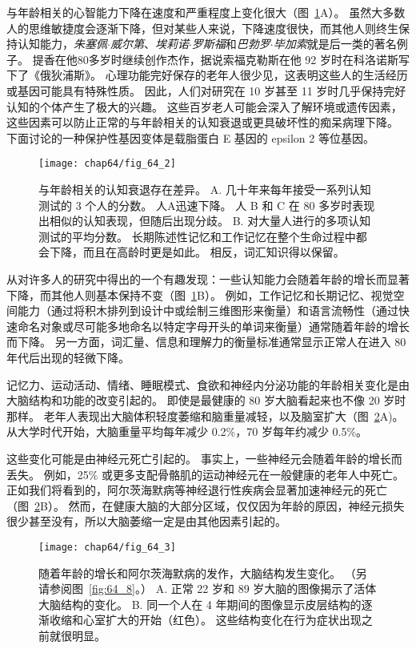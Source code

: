与年龄相关的心智能力下降在速度和严重程度上变化很大（图~\ref{fig:64_2}A）。
虽然大多数人的思维敏捷度会逐渐下降，但对某些人来说，下降速度很快，而其他人则终生保持认知能力，\textit{朱塞佩$\cdot$威尔第}、\textit{埃莉诺$\cdot$罗斯福}和\textit{巴勃罗$\cdot$毕加索}就是后一类的著名例子。
提香在他80多岁时继续创作杰作，据说索福克勒斯在他 92 岁时在科洛诺斯写下了《俄狄浦斯》。
心理功能完好保存的老年人很少见，这表明这些人的生活经历或基因可能具有特殊性质。
因此，人们对研究在 10 岁甚至 11 岁时几乎保持完好认知的个体产生了极大的兴趣。
这些百岁老人可能会深入了解环境或遗传因素，这些因素可以防止正常的与年龄相关的认知衰退或更具破坏性的痴呆病理下降。
下面讨论的一种保护性基因变体是载脂蛋白 E 基因的 epsilon 2 等位基因。


\begin{figure}[htbp]
	\centering
	\texttt{[image: chap64/fig\_64\_2]}
	\caption{与年龄相关的认知衰退存在差异。
		A. 几十年来每年接受一系列认知测试的 3 个人的分数。
		人A迅速下降。
		人 B 和 C 在 80 多岁时表现出相似的认知表现，但随后出现分歧\cite{rubin1998prospective}。
		B. 对大量人进行的多项认知测试的平均分数。
		长期陈述性记忆和工作记忆在整个生命过程中都会下降，而且在高龄时更是如此。
		相反，词汇知识得以保留\cite{park1996mediators}。}
	\label{fig:64_2}
\end{figure}


从对许多人的研究中得出的一个有趣发现：一些认知能力会随着年龄的增长而显著下降，而其他人则基本保持不变（图~\ref{fig:64_2}B）。
例如，工作记忆和长期记忆、视觉空间能力（通过将积木排列到设计中或绘制三维图形来衡量）和语言流畅性（通过快速命名对象或尽可能多地命名以特定字母开头的单词来衡量）通常随着年龄的增长而下降。
另一方面，词汇量、信息和理解力的衡量标准通常显示正常人在进入 80 年代后出现的轻微下降。


记忆力、运动活动、情绪、睡眠模式、食欲和神经内分泌功能的年龄相关变化是由大脑结构和功能的改变引起的。
即使是最健康的 80 岁大脑看起来也不像 20 岁时那样。
老年人表现出大脑体积轻度萎缩和脑重量减轻，以及脑室扩大（图~\ref{fig:64_3}A)。
从大学时代开始，大脑重量平均每年减少 0.2\%，70 岁每年约减少 0.5\%。


这些变化可能是由神经元死亡引起的。
事实上，一些神经元会随着年龄的增长而丢失。
例如，25\% 或更多支配骨骼肌的运动神经元在一般健康的老年人中死亡。
正如我们将看到的，阿尔茨海默病等神经退行性疾病会显著加速神经元的死亡（图~\ref{fig:64_3}B）。
然而，在健康大脑的大部分区域，仅仅因为年龄的原因，神经元损失很少甚至没有，所以大脑萎缩一定是由其他因素引起的。


\begin{figure}[htbp]
	\centering
	\texttt{[image: chap64/fig\_64\_3]}
	\caption{随着年龄的增长和阿尔茨海默病的发作，大脑结构发生变化。
		（另请参阅图~\ref{fig:64_8}。）
		A. 正常 22 岁和 89 岁大脑的图像揭示了活体大脑结构的变化。
		B. 同一个人在 4 年期间的图像显示皮层结构的逐渐收缩和心室扩大的开始（红色）。
		这些结构变化在行为症状出现之前就很明显。}
	\label{fig:64_3}
\end{figure}


